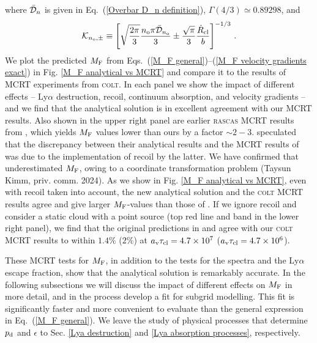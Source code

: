 \documentclass[fleqn,usenatbib]{mnras}
\newcommand{\taucl}{\tau_{\rm cl}}
\begin{document}
where $\Bar{\mathcal{D}}_n$ is given in Eq.~(\ref{Overbar D_n definition}), $\Gamma(4/3) \simeq 0.89298$, and 
\begin{equation}
    \mathcal{K}_{n_{\rm o},\pm} \equiv  \left[\sqrt{\dfrac{2\pi}{3}} \dfrac{n_{\rm o} \pi \Bar{\mathcal{D}}_{n_{\rm o}}}{3} \pm \dfrac{\sqrt{\pi}}{3} \dfrac{\Dot{R}_{\rm cl}}{b} \right]^{-1/3} \, .
\end{equation}
We plot the predicted $M_{\rm F}$ from Eqs.~(\ref{M_F general})--(\ref{M_F velocity gradients exact}) in Fig. \ref{M_F analytical vs MCRT} and compare it to the results of MCRT experiments from \textsc{colt}. In each panel we show the impact of different effects -- Ly$\alpha$ destruction, recoil, continuum absorption, and velocity gradients -- and we find that the analytical solution is in excellent agreement with our MCRT results. Also shown in the upper right panel are earlier \textsc{rascas} MCRT results from \cite{Kimm2018}, which yields $M_{\rm F}$ values lower than ours by a factor $\sim 2-3$. \cite{Tomaselli2021} speculated that the discrepancy between their analytical results and the MCRT results of \cite{Kimm2018} was due to the implementation of recoil by the latter. We have confirmed that \cite{Kimm2018} underestimated $M_{\rm F}$, owing to a coordinate transformation problem (Taysun Kimm, priv. comm. 2024). As we show in Fig. \ref{M_F analytical vs MCRT}, even with recoil taken into account, the new analytical solution and the \textsc{colt} MCRT results agree and give larger $M_{\rm F}$-values than those of \cite{Kimm2018}. If we ignore recoil and consider a static cloud with a point source (top red line and band in the lower right panel), we find that the original predictions in \cite{Lao2020} and \cite{Tomaselli2021} agree with our \textsc{colt} MCRT results to within $1.4\%$ ($2\%$) at $a_{\rm v}\taucl = 4.7 \times 10^7$ ($a_{\rm v}\taucl = 4.7 \times 10^6$).

These MCRT tests for $M_{\rm F}$, in addition to the tests for the spectra and the Ly$\alpha$ escape fraction, show that the analytical solution is remarkably accurate. In the following subsections we will discuss the impact of different effects on $M_{\rm F}$ in more detail, and in the process develop a fit for subgrid modelling. This fit is significantly faster and more convenient to evaluate than the general expression in Eq.~(\ref{M_F general}). We leave the study of physical processes that determine $p_{\rm d}$ and $\epsilon$ to Sec. \ref{Lya destruction} and \ref{Lya absorption processes}, respectively.
\end{document}
